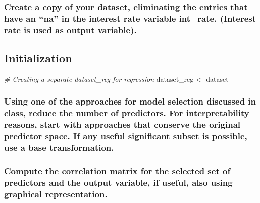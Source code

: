 \documentclass[]{article}
\newenvironment{Shaded}{\begin{snugshade}}{\end{snugshade}}
\newcommand{\CommentTok}[1]{\textcolor[rgb]{0.56,0.35,0.01}{\textit{#1}}}
\newcommand{\NormalTok}[1]{#1}
\newcommand{\StringTok}[1]{\textcolor[rgb]{0.31,0.60,0.02}{#1}}
\begin{document}
\hypertarget{create-a-copy-of-your-dataset-eliminating-the-entries-that-have-an-na-in-the-interest-rate-variable-int_rate.-interest-rate-is-used-as-output-variable.}{%
\subsubsection{Create a copy of your dataset, eliminating the entries
that have an ``na'' in the interest rate variable int\_rate. (Interest
rate is used as output
variable).}\label{create-a-copy-of-your-dataset-eliminating-the-entries-that-have-an-na-in-the-interest-rate-variable-int_rate.-interest-rate-is-used-as-output-variable.}}

\hypertarget{initialization}{%
\subsection{Initialization}\label{initialization}}

\begin{Shaded}
\begin{Highlighting}[]
\CommentTok{# Creating a separate dataset_reg for regression}
\NormalTok{dataset_reg <-}\StringTok{ }\NormalTok{dataset}
\end{Highlighting}
\end{Shaded}

\hypertarget{using-one-of-the-approaches-for-model-selection-discussed-in-class-reduce-the-number-of-predictors.-for-interpretability-reasons-start-with-approaches-that-conserve-the-original-predictor-space.-if-any-useful-significant-subset-is-possible-use-a-base-transformation.}{%
\subsubsection{Using one of the approaches for model selection discussed
in class, reduce the number of predictors. For interpretability reasons,
start with approaches that conserve the original predictor space. If any
useful significant subset is possible, use a base
transformation.}\label{using-one-of-the-approaches-for-model-selection-discussed-in-class-reduce-the-number-of-predictors.-for-interpretability-reasons-start-with-approaches-that-conserve-the-original-predictor-space.-if-any-useful-significant-subset-is-possible-use-a-base-transformation.}}

\hypertarget{compute-the-correlation-matrix-for-the-selected-set-of-predictors-and-the-output-variable-if-useful-also-using-graphical-representation.}{%
\subsubsection{Compute the correlation matrix for the selected set of
predictors and the output variable, if useful, also using graphical
representation.}\label{compute-the-correlation-matrix-for-the-selected-set-of-predictors-and-the-output-variable-if-useful-also-using-graphical-representation.}}
\end{document}
